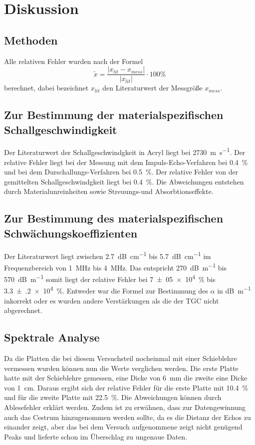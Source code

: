 \section{Diskussion}
\label{sec:Diskussion}
\subsection{Methoden}
Alle relativen Fehler wurden nach der Formel
\begin{equation*}
  \tilde{x} = \frac{ \lvert x_{lit} - x_{mess} \rvert}{\lvert x_{lit} \rvert}
  \cdot 100 \%
\end{equation*}
berechnet, dabei bezeichnet $x_{lit}$ den Literaturwert der Messgröße $x_{mess}$.
\subsection{Zur Bestimmung der materialspezifischen Schallgeschwindigkeit}
Der Literaturwert der Schallgeschwindgkeit in Acryl \cite{oly} liegt bei
\SI{2730}{\meter \per \second}. Der relative Fehler liegt bei der Messung mit
dem Impuls-Echo-Verfahren bei \SI{0.4}{\percent} und bei dem Durschallungs-Verfahren
bei \SI{0.5}{\percent}. Der relative Fehler von der gemittelten Schallgeschwindgkeit
liegt bei \SI{0.4}{\percent}. Die Abweichungen entstehen durch Materialunreinheiten
sowie Streuungs-und Absorbtionseffekte.
\subsection{Zur Bestimmung des materialspezifischen Schwächungskoeffizienten}
Der Literaturwert liegt zwischen
\SI{2.7}{\dB\per\centi\meter} bis \SI{5.7}{\dB\per\centi\meter} \cite{gampt} im Frequenzbereich
von \SI{1}{\mega\hertz} bis \SI{4}{\mega\hertz}. Das entspricht
\SI{270}{\dB\per\meter} bis \SI{570}{\dB\per\meter} somit liegt der relative
Fehler bei \SI{7(05)e4}{\percent} bis \SI{3.3(2)e4}{\percent}. Entweder war die
Formel zur Bestimmung des $\alpha$ in \si{\dB\per\meter} inkorrekt oder
es wurden andere Verstärkungen als die der TGC nicht abgerechnet.

\subsection{Spektrale Analyse}
Da die Platten die bei diesem Versuchsteil nocheinmal mit einer Schieblehre
vermessen wurden können nun die Werte verglichen werden. Die erste Platte hatte
mit der Schieblehre gemessen, eine Dicke von \SI{6}{\milli\meter} die zweite
eine Dicke von \SI{1}{\centi\meter}. Daraus ergibt sich der relative Fehler für
die erste Platte mit \SI{10.4}{\percent} und für die zweite Platte mit
\SI{22.5}{\percent}. Die Abweichungen können durch Ablesefehler erklärt werden.
Zudem ist zu erwähnen, dass zur Datengewinnung
auch das Cestrum hinzugenommen werden sollte, da es die Distanz der Echos zu einander
zeigt, aber das bei dem Versuch aufgenommene zeigt nicht genügend Peaks und lieferte
schon im Überschlag zu ungenaue Daten.

